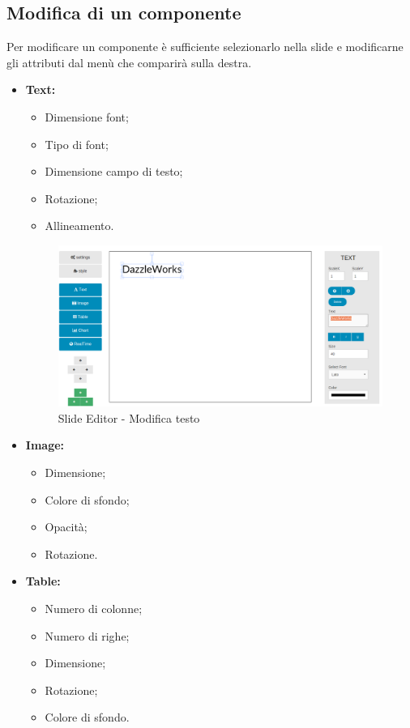 \subsection{Modifica di un componente}
Per modificare un componente è sufficiente selezionarlo nella \gls{slide} e modificarne gli attributi dal menù che comparirà sulla destra.
\begin{itemize}

	\item \textbf{Text:}
		\begin{itemize}
			\item Dimensione \gls{font};
			\item Tipo di \gls{font};
			\item Dimensione campo di testo;
			\item Rotazione;
			\item Allineamento.
		\end{itemize}
		 \begin{figure}[h] 
		    \centering 
		    \includegraphics[scale=0.37] {img/MUslideEditor.png}
		    \caption{\gls{Slide} Editor - Modifica testo} 
		\end{figure}
	
	\item \textbf{Image:}
		\begin{itemize}
			\item Dimensione;
			\item Colore di sfondo;
			\item Opacità;
			\item Rotazione.
		\end{itemize}

	\item \textbf{Table:}
		\begin{itemize}
			\item Numero di colonne;
			\item Numero di righe;
			\item Dimensione;
			\item Rotazione;
			\item Colore di sfondo.
		\end{itemize}
		

\end{itemize}
